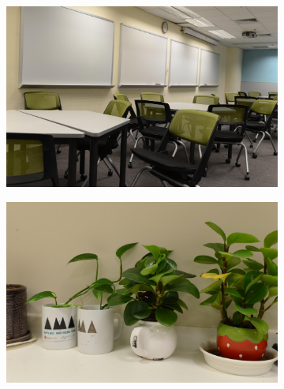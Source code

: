 \begin{figure}
\begin{subfigure}[t]{0.4\textwidth}
    \end{subfigure}
    \hfill
    \begin{subfigure}[t]{0.4\textwidth}
        \centering
        \includegraphics[width=1\textwidth]{images/dataset/NikonD800_4-5_160_1800_classroom_mean.JPG}
    \end{subfigure}
    \hfill
    \begin{subfigure}[t]{0.4\textwidth}
        \centering
        \includegraphics[width=1\textwidth]{images/dataset/NikonD800_6-3_125_5000_plant_mean.JPG}
    \end{subfigure}
    \hfill
    \begin{subfigure}[t]{0.4\textwidth}
        \centering

\end{subfigure}
\end{figure}
